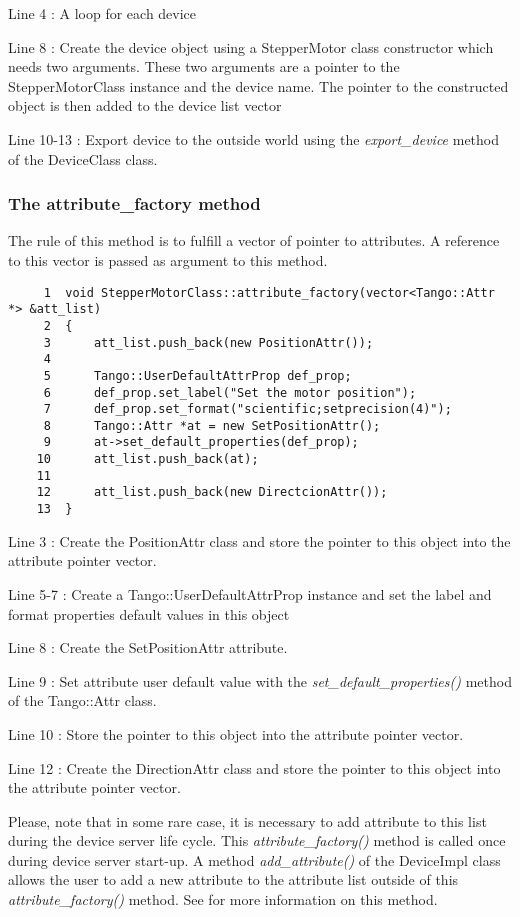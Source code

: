 Line 4 : A loop for each device

Line 8 : Create the device object using a StepperMotor class constructor
which needs two arguments. These two arguments are a pointer to the
StepperMotorClass instance and the device name. The pointer to the
constructed object is then added to the device list vector

Line 10-13 : Export device to the outside world using the \emph{export\_device}
method of the DeviceClass class.


\subsubsection{The attribute\_factory method}

The rule of this method is to fulfill a vector of pointer to attributes.
A reference to this vector is passed as argument to this method.


\begin{verbatim}
     1  void StepperMotorClass::attribute_factory(vector<Tango::Attr *> &att_list)
     2  {
     3      att_list.push_back(new PositionAttr());
     4  
     5      Tango::UserDefaultAttrProp def_prop;
     6      def_prop.set_label("Set the motor position");
     7      def_prop.set_format("scientific;setprecision(4)");
     8      Tango::Attr *at = new SetPositionAttr();
     9      at->set_default_properties(def_prop);
    10      att_list.push_back(at);
    11  
    12      att_list.push_back(new DirectcionAttr());
    13  }
\end{verbatim}


Line 3 : Create the PositionAttr class and store the pointer to this
object into the attribute pointer vector.

Line 5-7 : Create a Tango::UserDefaultAttrProp instance and set the
label and format properties default values in this object

Line 8 : Create the SetPositionAttr attribute. 

Line 9 : Set attribute user default value with the \emph{set\_default\_properties()}
method of the Tango::Attr class.

Line 10 : Store the pointer to this object into the attribute pointer
vector.

Line 12 : Create the DirectionAttr class and store the pointer to
this object into the attribute pointer vector.

Please, note that in some rare case, it is necessary to add attribute
to this list during the device server life cycle. This \emph{attribute\_factory()}
method is called once during device server start-up. A method \emph{add\_attribute()}
of the DeviceImpl class allows the user to add a new attribute to
the attribute list outside of this \emph{attribute\_factory()} method.
See \cite{TANGO_ref_man} for more information on this method.


